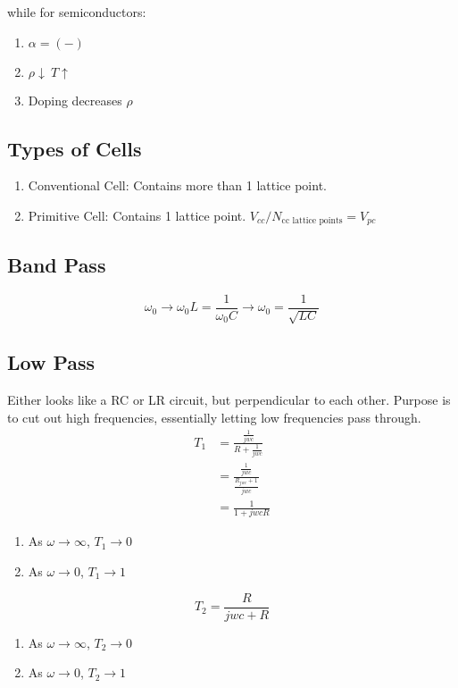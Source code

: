 \documentclass[10pt,a4paper]{article}
\begin{document}
 while for semiconductors:
\begin{enumerate}
  \item $\alpha = (-)$
  \item $\rho \downarrow ~ T \uparrow$
  \item Doping decreases $\rho$
\end{enumerate}

\subsection{Types of Cells}
\begin{enumerate}
    \item Conventional Cell: Contains more than 1 lattice point.
    \item Primitive Cell: Contains 1 lattice point. $V_{cc} / N_{\textrm{cc lattice points}} = V_{pc}$
\end{enumerate}

\subsection{Band Pass}
\begin{equation}
 \omega_0 \rightarrow \omega_0L = \frac{1}{\omega_0 C} \rightarrow \omega_0 = \frac{1}{\sqrt{LC}}
\end{equation}

\subsection{Low Pass}
Either looks like a RC or LR circuit, but perpendicular to each other. Purpose is to cut out high frequencies, essentially letting low frequencies pass through.
\begin{align}
    T_1 &= \frac{\frac{1}{jwc}}{R + \frac{1}{jwc}}\\
    &= \frac{\frac{1}{jwc}}{\frac{R_{jwc} + 1}{jwc}}\\
    &= \frac{1}{1 + jwcR}
\end{align}
\begin{enumerate}
    \item As $\omega \rightarrow \infty$, $T_1 \rightarrow 0$
    \item As $\omega \rightarrow 0$, $T_1 \rightarrow 1$
\end{enumerate}
\begin{equation}
 T_2 = \frac{R}{jwc + R} 
\end{equation}
\begin{enumerate}
    \item As $\omega \rightarrow \infty$, $T_2 \rightarrow 0$
    \item As $\omega \rightarrow 0$, $T_2 \rightarrow 1$
\end{enumerate}
\end{document}
